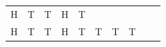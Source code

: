 {\begin{center}
\begin{xtabular*}{\mytablewidth}[t]{|p{10\mystarwidth}|p{10\mystarwidth}|p{10\mystarwidth}|p{10\mystarwidth}|p{10\mystarwidth}|p{10\mystarwidth}|p{10\mystarwidth}|p{10\mystarwidth}|p{10\mystarwidth}|p{10\mystarwidth}|}
        H &
        T &
        T &
        H &
        T%
     \tabularnewline{}
        H &
        T &
        T &
        H &
        T &
        T &
        T &
        T &

\end{xtabular*}
\end{center}}
